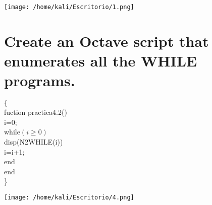\documentclass[11pt]{article}
\begin{document}
\texttt{[image: /home/kali/Escritorio/1.png]}

\newpage

\section{Create an Octave script that enumerates all the WHILE programs.}

\begin{whilecode}[H]
$\{$
\\
fuction practica4.2()
\\
\hspace{0.5cm} i=0;
\\
\hspace{0.75cm} while{$ ( i\geq 0 )$}
\\
\hspace{1cm} disp(N2WHILE(i))
\\
\hspace{1cm} i=i+1;
\\
\hspace{0.75cm} end
\\
end
\\
\}
\end{whilecode}

\texttt{[image: /home/kali/Escritorio/4.png]}
\end{document}

